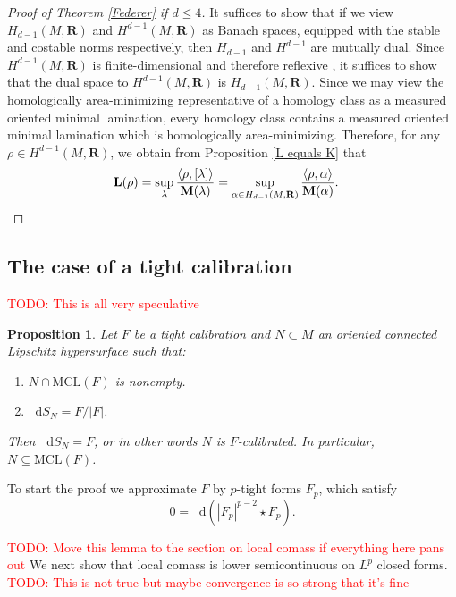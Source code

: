 \documentclass[reqno,11pt]{amsart}
\newcommand{\RR}{\mathbf{R}}
\newcommand*\dif{\mathop{}\!\mathrm{d}}
\newcommand{\MCL}{\mathrm{MCL}}
\newcommand{\Mass}{\mathbf M}
\newcommand{\Comass}{\mathbf L}
\newtheorem{proposition}[theorem]{Proposition}
\theoremstyle{definition}
\numberwithin{equation}{section}
\newcommand\todo[1]{\textcolor{red}{TODO: #1}}
\begin{document}
\begin{proof}[Proof of Theorem \ref{Federer} if $d \leq 4$]
It suffices to show that if we view $H_{d - 1}(M, \RR)$ and $H^{d - 1}(M, \RR)$ as Banach spaces, equipped with the stable and costable norms respectively, then $H_{d - 1}$ and $H^{d - 1}$ are mutually dual.
Since $H^{d - 1}(M, \RR)$ is finite-dimensional and therefore reflexive \cite[Theorem 1.13.5]{megginson1998introduction}, it suffices to show that the dual space to $H^{d - 1}(M, \RR)$ is $H_{d - 1}(M, \RR)$.
Since we may view the homologically area-minimizing representative of a homology class as a measured oriented minimal lamination, every homology class contains a measured oriented minimal lamination which is homologically area-minimizing.
Therefore, for any $\rho \in H^{d - 1}(M, \RR)$, we obtain from Proposition \ref{L equals K} that
\begin{align*}
\Comass(\rho) &= \sup_\lambda \frac{\langle \rho, [\lambda] \rangle}{\Mass(\lambda)} = \sup_{\alpha \in H_{d - 1}(M, \RR)} \frac{\langle \rho, \alpha\rangle}{\Mass(\alpha)}. \qedhere 
\end{align*}
\end{proof}

\subsection{The case of a tight calibration}
\todo{This is all very speculative}

\begin{proposition}
Let $F$ be a tight calibration and $N \subset M$ an oriented connected Lipschitz hypersurface such that:
\begin{enumerate}
	\item $N \cap \MCL(F)$ is nonempty.
	\item $\dif S_N = F/|F|$.
\end{enumerate}
Then $\dif S_N = F$, or in other words $N$ is $F$-calibrated.
In particular, $N \subseteq \MCL(F)$.
\end{proposition}

To start the proof we approximate $F$ by $p$-tight forms $F_p$, which satisfy 
$$0 = \dif(|F_p|^{p - 2} \star F_p).$$

\todo{Move this lemma to the section on local comass if everything here pans out}
We next show that local comass is lower semicontinuous on $L^p$ closed forms.
\todo{This is not true but maybe convergence is so strong that it's fine}
\end{document}
